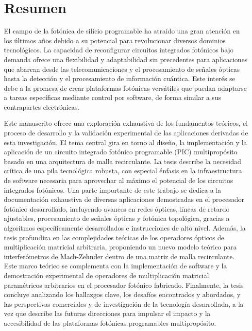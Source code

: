 

\chapter*{Resumen}

El campo de la fotónica de silicio programable ha atraído una gran atención en los últimos años debido a su potencial para revolucionar diversos dominios tecnológicos.
La capacidad de reconfigurar circuitos integrados fotónicos bajo demanda ofrece una flexibilidad y adaptabilidad sin precedentes para aplicaciones que abarcan desde las telecomunicaciones y el procesamiento de señales ópticas hasta la detección y el procesamiento de información cuántica.
Este interés se debe a la promesa de crear plataformas fotónicas versátiles que puedan adaptarse a tareas específicas mediante control por software, de forma similar a sus contrapartes electrónicas.

Este manuscrito ofrece una exploración exhaustiva de los fundamentos teóricos, el proceso de desarrollo y la validación experimental de las aplicaciones derivadas de esta investigación.
El tema central gira en torno al diseño, la implementación y la aplicación de un circuito integrado fotónico programable (PIC) multipropósito basado en una arquitectura de malla recirculante.
La tesis describe la necesidad crítica de una pila tecnológica robusta, con especial énfasis en la infraestructura de software necesaria para aprovechar al máximo el potencial de los circuitos integrados fotónicos.
Una parte importante de este trabajo se dedica a la documentación exhaustiva de diversas aplicaciones demostradas en el procesador fotónico desarrollado, incluyendo avances en redes ópticas, líneas de retardo ajustables, procesamiento de señales ópticas y fotónica topológica, gracias a algoritmos específicamente desarrollados e instrucciones de alto nivel.
Además, la tesis profundiza en las complejidades teóricas de los operadores ópticos de multiplicación matricial arbitraria, proponiendo un nuevo modelo teórico para interferómetros de Mach-Zehnder dentro de una matriz de malla recirculante.
Este marco teórico se complementa con la implementación de software y la demostración experimental de operadores de multiplicación matricial paramétricos arbitrarios en el procesador fotónico fabricado.
Finalmente, la tesis concluye analizando los hallazgos clave, los desafíos encontrados y abordados, y las perspectivas comerciales y de investigación de la tecnología desarrollada, a la vez que describe las futuras direcciones para impulsar el impacto y la accesibilidad de las plataformas fotónicas programables multipropósito.

